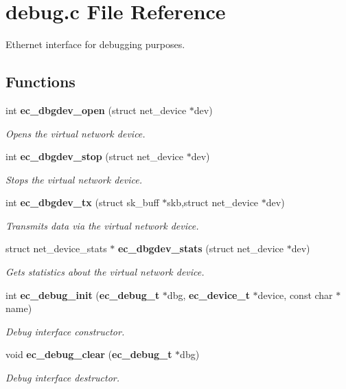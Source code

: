 \section{debug.\-c File Reference}
\label{debug_8c}


Ethernet interface for debugging purposes.  


\subsection*{Functions}
\begin{DoxyCompactItemize}
\item 
int {\bf ec\-\_\-dbgdev\-\_\-open} (struct net\-\_\-device $\ast$dev)
\begin{DoxyCompactList}\small\item\em Opens the virtual network device. \end{DoxyCompactList}\item 
int {\bf ec\-\_\-dbgdev\-\_\-stop} (struct net\-\_\-device $\ast$dev)
\begin{DoxyCompactList}\small\item\em Stops the virtual network device. \end{DoxyCompactList}\item 
int {\bf ec\-\_\-dbgdev\-\_\-tx} (struct sk\-\_\-buff $\ast$skb,struct net\-\_\-device $\ast$dev)
\begin{DoxyCompactList}\small\item\em Transmits data via the virtual network device. \end{DoxyCompactList}\item 
struct net\-\_\-device\-\_\-stats $\ast$ {\bf ec\-\_\-dbgdev\-\_\-stats} (struct net\-\_\-device $\ast$dev)
\begin{DoxyCompactList}\small\item\em Gets statistics about the virtual network device. \end{DoxyCompactList}\item 
int {\bf ec\-\_\-debug\-\_\-init} ({\bf ec\-\_\-debug\-\_\-t} $\ast$dbg, {\bf ec\-\_\-device\-\_\-t} $\ast$device, const char $\ast$name)
\begin{DoxyCompactList}\small\item\em Debug interface constructor. \end{DoxyCompactList}\item 
void {\bf ec\-\_\-debug\-\_\-clear} ({\bf ec\-\_\-debug\-\_\-t} $\ast$dbg)
\begin{DoxyCompactList}\small\item\em Debug interface destructor. \end{DoxyCompactList}\item 

\end{DoxyCompactItemize}
